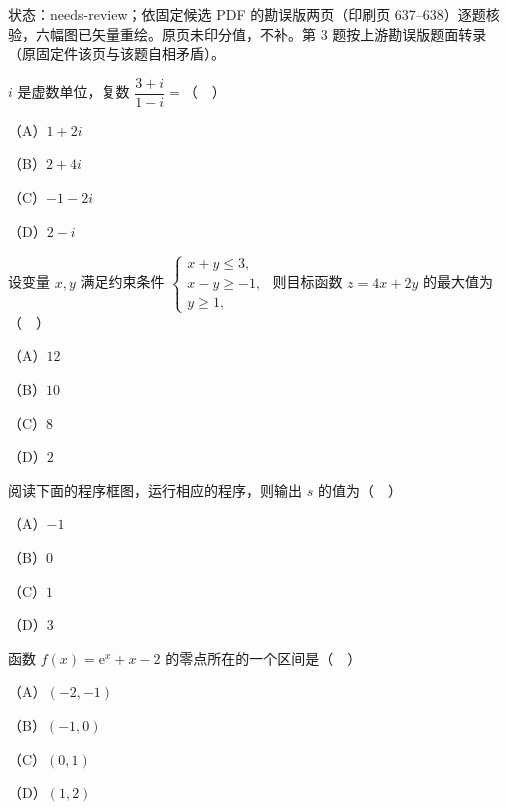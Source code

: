 

状态：needs-review；依固定候选 PDF 的勘误版两页（印刷页 637–638）逐题核验，六幅图已矢量重绘。原页未印分值，不补。第 3 题按上游勘误版题面转录（原固定件该页与该题自相矛盾）。


\begin{question}
$i$ 是虚数单位，复数 $\dfrac{3+i}{1-i}=$（　）

（A）$1+2i$

（B）$2+4i$

（C）$-1-2i$

（D）$2-i$

\end{question}
\begin{question}
设变量 $x,y$ 满足约束条件 $\begin{cases}x+y\leqslant3,\\ x-y\geqslant-1,\\ y\geqslant1,\end{cases}$ 则目标函数 $z=4x+2y$ 的最大值为（　）

（A）$12$

（B）$10$

（C）$8$

（D）$2$

\Needspace{0.4\textheight}
\end{question}
\begin{question}
阅读下面的程序框图，运行相应的程序，则输出 $s$ 的值为（　）
\nopagebreak[4]
\begin{center}\end{center}
\nopagebreak[4]
（A）$-1$

（B）$0$

（C）$1$

（D）$3$

\end{question}
\begin{question}
函数 $f(x)=\mathrm e^x+x-2$ 的零点所在的一个区间是（　）

（A）$(-2,-1)$

（B）$(-1,0)$

（C）$(0,1)$

（D）$(1,2)$

\end{question}
